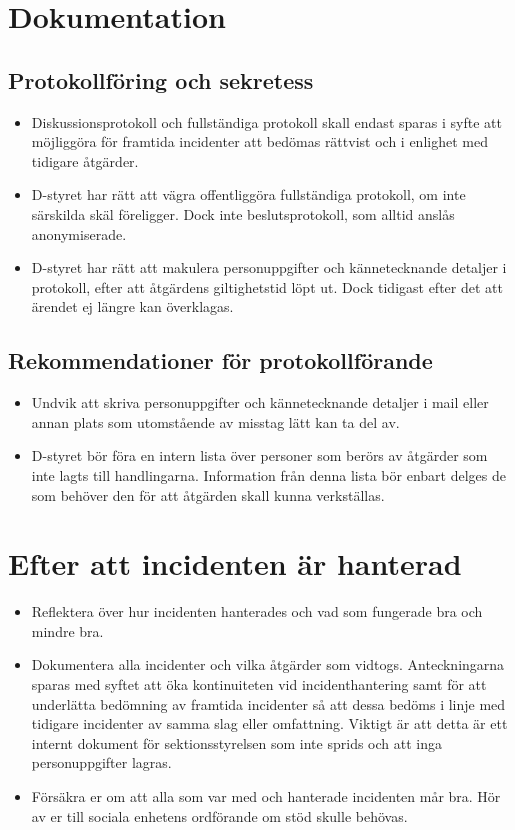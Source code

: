 \documentclass{dtek}
\begin{document}
\section{Dokumentation}
\subsection{Protokollföring och sekretess}
\begin{itemize}
  \item Diskussionsprotokoll och fullständiga protokoll skall endast sparas i syfte att möjliggöra för framtida incidenter att bedömas rättvist och i enlighet med tidigare åtgärder.
  \item D-styret har rätt att vägra offentliggöra fullständiga protokoll, om inte särskilda skäl föreligger. Dock inte beslutsprotokoll, som alltid anslås anonymiserade.
  \item D-styret har rätt att makulera personuppgifter och kännetecknande detaljer i protokoll, efter att åtgärdens giltighetstid löpt ut. Dock tidigast efter det att ärendet ej längre kan överklagas.
  \end{itemize}
\subsection{Rekommendationer för protokollförande}
\begin{itemize}
  \item Undvik att skriva personuppgifter och kännetecknande detaljer i mail eller annan plats som utomstående av misstag lätt kan ta del av.
  \item D-styret bör föra en intern lista över personer som berörs av åtgärder som inte lagts till handlingarna. Information från denna lista bör enbart delges de som behöver den för att åtgärden skall kunna verkställas.
\end{itemize}

\section{Efter att incidenten är hanterad}
\begin{itemize}
    \item Reflektera över hur incidenten hanterades och vad som fungerade bra och mindre bra. 
    \item Dokumentera alla incidenter och vilka åtgärder som vidtogs. Anteckningarna sparas med syftet att öka kontinuiteten vid incidenthantering samt för att underlätta bedömning av  framtida incidenter så att dessa bedöms i linje med tidigare incidenter av samma slag eller omfattning. Viktigt är att detta är ett internt dokument för sektionsstyrelsen som inte sprids och att inga personuppgifter lagras.
    \item Försäkra er om att alla som var med och hanterade incidenten mår bra. Hör av er till sociala enhetens ordförande om stöd skulle behövas.
\end{itemize}
\end{document}
